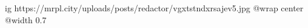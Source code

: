  
 
 
 
 

\ifcmt
  ig https://mrpl.city/uploads/posts/redactor/vgxtstndxrsajev5.jpg
  @wrap center
  @width 0.7
\fi
